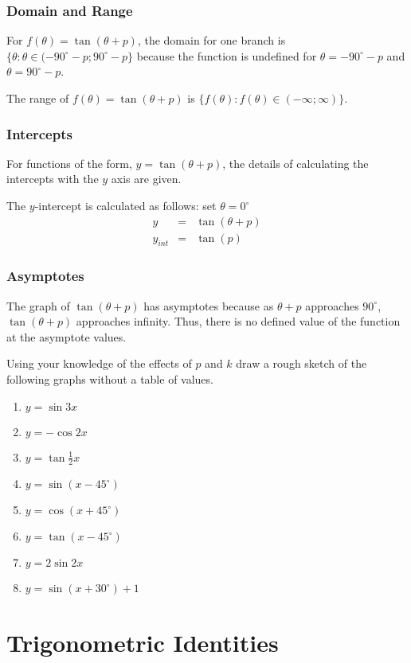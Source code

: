 \subsubsection{Domain and Range}
For $f(\theta)=\tan(\theta+p)$, the domain for one branch is $\{\theta:\theta\in(-90^{\circ}-p;90^{\circ}-p\}$ because the function is undefined for $\theta=-90^{\circ}-p$ and $\theta=90^{\circ}-p$.

The range of $f(\theta)=\tan(\theta + p)$ is $\{f(\theta):f(\theta)\in(-\infty;\infty)\}$.

\subsubsection{Intercepts}
For functions of the form, $y=\tan(\theta + p)$, the details of calculating the intercepts with the $y$ axis are given.

The $y$-intercept is calculated as follows: set $\theta = 0^\circ$
\begin{eqnarray*}
y&=&\tan(\theta + p)\\
y_{int}&=&\tan(p)
\end{eqnarray*}

\subsubsection{Asymptotes}
The graph of $\tan (\theta+p)$ has asymptotes because as $\theta +p$ approaches $90^\circ$, $\tan(\theta+p)$ approaches infinity. Thus, there is no defined value of the function at the asymptote values.

{
Using your knowledge of the effects of $p$ and $k$ draw a rough sketch of the following graphs without a table of values.
\begin{enumerate}
\item $y= \sin 3x$
\item $y= -\cos 2x$
\item $y= \tan \tfrac{1}{2}x$
\item $y= \sin(x-45^\circ)$
\item $y= \cos(x+45^\circ)$
\item $y= \tan(x-45^\circ)$
\item $y= 2\sin 2x$
\item $y= \sin(x+30^\circ)+1$
\end{enumerate}


\practiceinfo}

\section{Trigonometric Identities}

